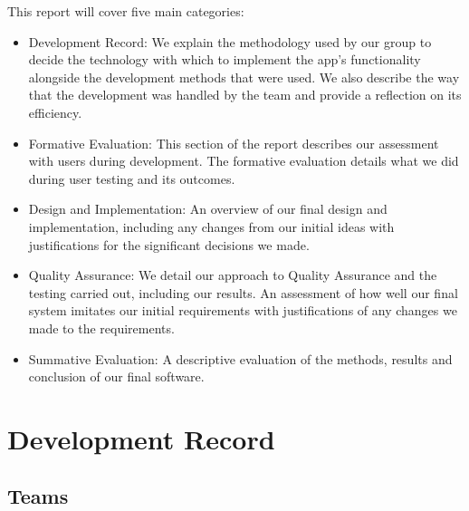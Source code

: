 \documentclass[12pt,a4paper]{article}
\begin{document}
      This report will cover five main categories:

      \begin{itemize}
        \item {Development Record}:
          We explain the methodology used by our group to decide the technology with which to implement the app’s functionality alongside the development methods that were used. We also describe the way that the development was handled by the team and provide a reflection on its efficiency.

        \item {Formative Evaluation}:
          This section of the report describes our assessment with users during development. The formative evaluation details what we did during user testing and its outcomes.

        \item {Design and Implementation}:
          An overview of our final design and implementation, including any changes from our initial ideas with justifications for the significant decisions we made.

        \item {Quality Assurance}:
          We detail our approach to Quality Assurance and the testing carried out, including our results. An assessment of how well our final system imitates our initial requirements with justifications of any changes we made to the requirements.

        \item {Summative Evaluation}:
          A descriptive evaluation of the methods, results and conclusion of our final software.
      \end{itemize}

    \section{Development Record}
      \subsection{Teams} 
\end{document}
